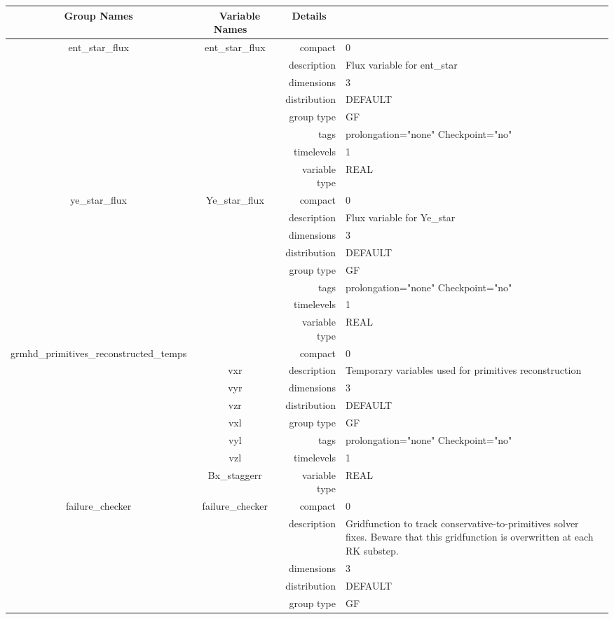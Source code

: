 \begin{tabular*}{150mm}{|c|c@{\extracolsep{\fill}}|rl|} \hline 
~ {\bf Group Names} ~ & ~ {\bf Variable Names} ~  &{\bf Details} ~ & ~ \\ 
\hline 
ent\_star\_flux & ent\_star\_flux & compact & 0 \\ 
 &  & description & Flux variable for ent\_star \\ 
 &  & dimensions & 3 \\ 
 &  & distribution & DEFAULT \\ 
 &  & group type & GF \\ 
 &  & tags & prolongation="none" Checkpoint="no" \\ 
 &  & timelevels & 1 \\ 
 &  & variable type & REAL \\ 
\hline 
ye\_star\_flux & Ye\_star\_flux & compact & 0 \\ 
 &  & description & Flux variable for Ye\_star \\ 
 &  & dimensions & 3 \\ 
 &  & distribution & DEFAULT \\ 
 &  & group type & GF \\ 
 &  & tags & prolongation="none" Checkpoint="no" \\ 
 &  & timelevels & 1 \\ 
 &  & variable type & REAL \\ 
\hline 
grmhd\_primitives\_reconstructed\_temps &  & compact & 0 \\ 
 & vxr & description & Temporary variables used for primitives reconstruction \\ 
 & vyr & dimensions & 3 \\ 
 & vzr & distribution & DEFAULT \\ 
 & vxl & group type & GF \\ 
 & vyl & tags & prolongation="none" Checkpoint="no" \\ 
 & vzl & timelevels & 1 \\ 
 & Bx\_staggerr & variable type & REAL \\ 
\hline 
failure\_checker & failure\_checker & compact & 0 \\ 
 &  & description & Gridfunction to track conservative-to-primitives solver fixes. Beware that this gridfunction is overwritten at each RK substep. \\ 
 &  & dimensions & 3 \\ 
 &  & distribution & DEFAULT \\ 
 &  & group type & GF \\ 

\end{tabular*}
